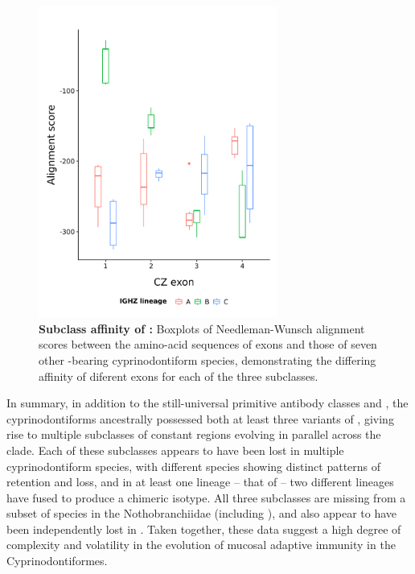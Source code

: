 \begin{figure}
	\centering
	\includegraphics[width=0.7\textwidth]{_Figures/png/ppl-cz-aln-aa.png}
	\caption[Subclass affinity of  ]{\textbf{Subclass affinity of  :} 
	Boxplots of Needleman-Wunsch alignment scores between the amino-acid sequences of  \cz{} exons and those of seven other -bearing cyprinodontiform species, demonstrating the differing affinity of diferent  exons for each of the three  subclasses.}
	\label{fig:ppl-cz-aln}
\end{figure}
	
In summary, in addition to the still-universal primitive antibody classes  and , the cyprinodontiforms ancestrally possessed both at least three variants of , giving rise to multiple subclasses of  constant regions evolving in parallel across the clade. Each of these subclasses appears to have been lost in multiple cyprinodontiform species, with different species showing distinct patterns of retention and loss, and in at least one lineage -- that of  -- two different  lineages have fused to produce a chimeric isotype. All three subclasses are missing from a subset of species in the Nothobranchiidae (including \nfu), and also appear to have been independently lost in . Taken together, these data suggest a high degree of complexity and volatility in the evolution of mucosal adaptive immunity in the Cyprinodontiformes.


